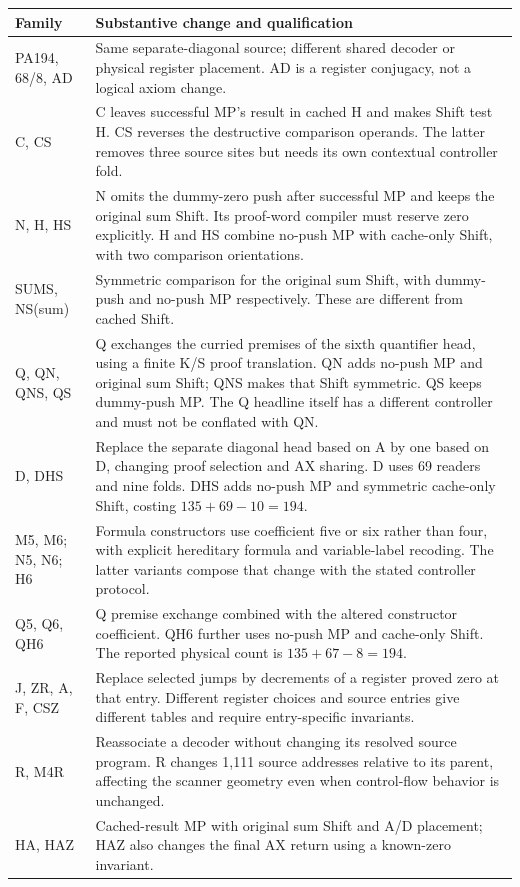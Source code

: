 \documentclass[10pt]{article}
\begin{document}
\begin{longtable}{p{.18\linewidth}p{.76\linewidth}}
\toprule
Family & Substantive change and qualification\\
\midrule
\endhead
PA194, 68/8, AD & Same separate-diagonal source; different shared decoder or
physical register placement. AD is a register conjugacy, not a logical axiom
change.\\
C, CS & C leaves successful MP's result in cached H and makes Shift test H.
CS reverses the destructive comparison operands. The latter removes three
source sites but needs its own contextual controller fold.\\
N, H, HS & N omits the dummy-zero push after successful MP and keeps the
original sum Shift. Its proof-word compiler must reserve zero explicitly.
H and HS combine no-push MP with cache-only Shift, with two comparison
orientations.\\
SUMS, NS(sum) & Symmetric comparison for the original sum Shift, with
dummy-push and no-push MP respectively. These are different from cached Shift.\\
Q, QN, QNS, QS & Q exchanges the curried premises of the sixth quantifier
head, using a finite K/S proof translation. QN adds no-push MP and original
sum Shift; QNS makes that Shift symmetric. QS keeps dummy-push MP. The Q
headline itself has a different controller and must not be conflated with QN.\\
D, DHS & Replace the separate diagonal head based on A by one based on D,
changing proof selection and AX sharing. D uses 69 readers and nine folds.
DHS adds no-push MP and symmetric cache-only Shift, costing
\(135+69-10=194\).\\
M5, M6; N5, N6; H6 & Formula constructors use coefficient five or six rather
than four, with explicit hereditary formula and variable-label recoding.
The latter variants compose that change with the stated controller protocol.\\
Q5, Q6, QH6 & Q premise exchange combined with the altered constructor
coefficient. QH6 further uses no-push MP and cache-only Shift. The reported
physical count is \(135+67-8=194\).\\
J, ZR, A, F, CSZ & Replace selected jumps by decrements of a register proved
zero at that entry. Different register choices and source entries give
different tables and require entry-specific invariants.\\
R, M4R & Reassociate a decoder without changing its resolved source program.
R changes 1,111 source addresses relative to its parent, affecting the
scanner geometry even when control-flow behavior is unchanged.\\
HA, HAZ & Cached-result MP with original sum Shift and A/D placement; HAZ
also changes the final AX return using a known-zero invariant.\\
\bottomrule
\end{longtable}
\end{document}
